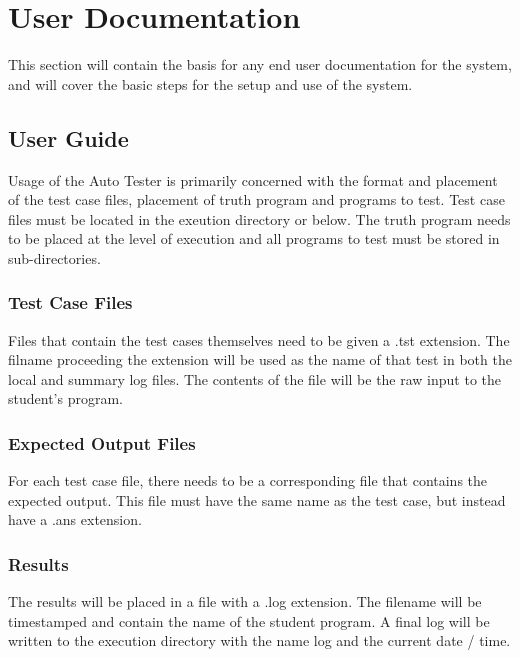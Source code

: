 
\chapter{User Documentation}

This section will contain the basis for any end user documentation for the system, 
and will cover the basic steps for the setup and use of the system.



\section{User Guide}

Usage of the Auto Tester is primarily concerned with the format and placement of the test case files, placement of truth program and programs to test. Test case files must be located in the exeution directory or below.  The truth program needs to be placed at the level of execution and all programs to test must be stored in sub-directories.

\subsection{Test Case Files}
Files that contain the test cases themselves need to be given a .tst extension. The filname proceeding the extension will be used as the name of that test in both the local and summary log files. The contents of the file will be the raw input to the student's program.

\subsection{Expected Output Files}
For each test case file, there needs to be a corresponding file that contains the expected output. This file must have the same name as the test case, but instead have a .ans extension.

\subsection{Results}
The results will be placed in a file with a .log extension. The filename will be timestamped and contain the name of the student program.  A final log will be written to the execution directory with the name log and the current date / time.

